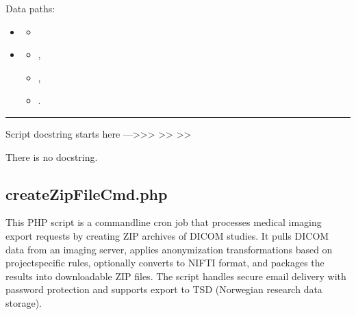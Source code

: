 \documentclass[letterpaper,10pt,english]{sphinxmanual}
\begin{document}
\sphinxAtStartPar
{}


\sphinxAtStartPar
{}


\sphinxAtStartPar
Data paths:
\begin{itemize}
\item {} \begin{description}
\begin{itemize}
\item {} 
\sphinxAtStartPar
{}

\end{itemize}

\end{description}

\item {} \begin{description}
\begin{itemize}
\item {} 
\sphinxAtStartPar
{},

\item {} 
\sphinxAtStartPar
{},

\item {} 
\sphinxAtStartPar
{}.

\end{itemize}

\end{description}

\end{itemize}


\bigskip\hrule\bigskip


\sphinxAtStartPar
Script docstring starts here —\textgreater{}\textgreater{}\textgreater{}
\textendash{}\textgreater{}\textgreater{}
\textendash{}\textgreater{}\textgreater{}

\sphinxAtStartPar
There is no docstring.

\sphinxstepscope


\subsection{createZipFileCmd.php}
\label{\detokenize{Architecture/scripts/createZipFileCmd:createzipfilecmd-php}}\label{\detokenize{Architecture/scripts/createZipFileCmd::doc}}
\sphinxAtStartPar
This PHP script is a command\sphinxhyphen{}line cron job that processes medical imaging export requests by creating ZIP archives of DICOM studies. It pulls DICOM data from an imaging server, applies anonymization transformations based on project\sphinxhyphen{}specific rules, optionally converts to NIFTI format, and packages the results into downloadable ZIP files. The script handles secure email delivery with password protection and supports export to TSD (Norwegian research data storage).
\end{document}
